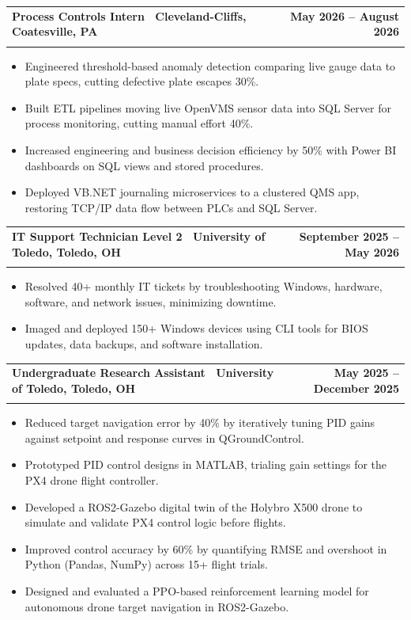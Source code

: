 \documentclass[letterpaper,11pt]{article}
\makeatletter
\newcommand{\resumeItem}[1]{\item\small{#1 \vspace{-4pt}}}
\newcommand{\resumeSubheading}[4]{
    \vspace{-2pt}\item
    \begin{tabular*}{1.0\textwidth}[t]{l@{\extracolsep{\fill}}r}
        \textbf{#1} & \textbf{\small #2} \\
        \textit{\small#3} & \textit{\small #4}
    \end{tabular*}\vspace{-7pt}
}
\newcommand{\resumeItemListStart}{\begin{itemize}}
\newcommand{\resumeItemListEnd}{\end{itemize}\vspace{-7pt}}
\makeatother
\begin{document}
\resumeSubheading
{\textbf{Process Controls Intern} \textnormal{\textbar\ Cleveland-Cliffs, Coatesville, PA}}{May 2026 -- August 2026}
{}{}
\vspace{-0.6cm}
\resumeItemListStart

\resumeItem{Engineered threshold-based anomaly detection comparing live gauge data to plate specs, cutting defective plate escapes 30\%.}
\vspace{0.15cm}
\resumeItem{Built ETL pipelines moving live OpenVMS sensor data into SQL Server for process monitoring, cutting manual effort 40\%.}
\vspace{0.15cm}
\resumeItem{Increased engineering and business decision efficiency by 50\% with Power BI dashboards on SQL views and stored procedures.}
\vspace{0.15cm}
\resumeItem{Deployed VB.NET journaling microservices to a clustered QMS app, restoring TCP/IP data flow between PLCs and SQL Server.}
\vspace{0.15cm}
\resumeItemListEnd
\resumeSubheading
{\textbf{IT Support Technician Level 2} \textnormal{\textbar\ University of Toledo, Toledo, OH}}{September 2025 -- May 2026}
{}{}
\vspace{-0.6cm}
\resumeItemListStart

\resumeItem{Resolved 40+ monthly IT tickets by troubleshooting Windows, hardware, software, and network issues, minimizing downtime.}

\vspace{0.15cm}
\resumeItem{Imaged and deployed 150+ Windows devices using CLI tools for BIOS updates, data backups, and software installation.}

\vspace{0.15cm}

\resumeItemListEnd

\resumeSubheading
{\textbf{Undergraduate Research Assistant} \textnormal{\textbar\ University of Toledo, Toledo, OH}}{May 2025 -- December 2025}
{}{}
\vspace{-0.6cm}
\resumeItemListStart
\resumeItem{Reduced target navigation error by 40\% by iteratively tuning PID gains against setpoint and response curves in QGroundControl.}
\vspace{0.15cm}
\resumeItem{Prototyped PID control designs in MATLAB, trialing gain settings for the PX4 drone flight controller.}
\vspace{0.15cm}
\resumeItem{Developed a ROS2-Gazebo digital twin of the Holybro X500 drone to simulate and validate PX4 control logic before flights.}
\vspace{0.15cm}
\resumeItem{Improved control accuracy by 60\% by quantifying RMSE and overshoot in Python (Pandas, NumPy) across 15+ flight trials.}
\vspace{0.15cm}
\resumeItem{Designed and evaluated a PPO-based reinforcement learning model for autonomous drone target navigation in ROS2-Gazebo.}
\resumeItemListEnd
\end{document}
